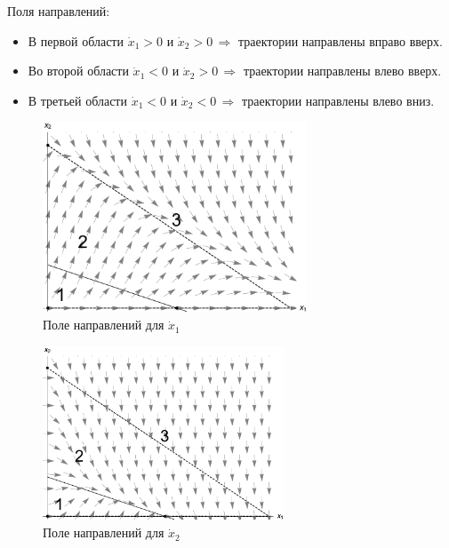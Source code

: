 \documentclass[12pt,a4paper]{article}
\begin{document}
    Поля направлений: 

    \begin{itemize}
        \setlength\itemsep{0.4em}
        \item В первой области $ \dot x_1 > 0 $ и $ \dot x_2 > 0 \, \Rightarrow $ траектории направлены вправо вверх.
        \item Во второй области $ \dot x_1 < 0 $ и $ \dot x_2 > 0 \, \Rightarrow $ траектории направлены влево вверх.
        \item В третьей области $ \dot x_1 < 0 $ и $ \dot x_2 < 0 \, \Rightarrow $ траектории направлены влево вниз.
    \end{itemize}

    \begin{figure}[h]
        \centering
        \includegraphics[width=0.7\textwidth]{dirFields_41.pdf}
        \caption{Поле направлений для $ \dot x_1 $}
        \label{fig:dirFields_41}
    \end{figure}

    \pagebreak

    \begin{figure}[h]
        \centering
        \includegraphics[width=0.64\textwidth]{dirFields_42.pdf}
        \caption{Поле направлений для $ \dot x_2 $}
        \label{fig:dirFields_42}
    \end{figure}
    
\end{document}
